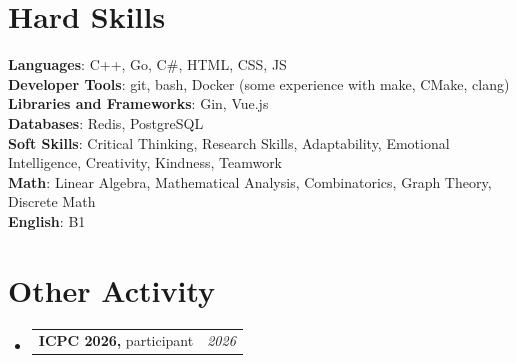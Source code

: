 \documentclass[a4paper,11pt]{article}
\makeatletter
\newcommand{\resumePOR}[3]{
\vspace{0.5mm}\item
    \begin{tabular*}{0.97\textwidth}[t]{l@{\extracolsep{\fill}}r}
        \textbf{#1}\hspace{0.3mm}#2 & \textit{\small{#3}} 
    \end{tabular*}
    \vspace{-2mm}
}
\newcommand{\resumeSubHeadingListStart}{\begin{itemize}[leftmargin=*,labelsep=0mm]}
\newcommand{\resumeSubHeadingListEnd}{\end{itemize}\vspace{2mm}}
\makeatother
\begin{document}
\section{\textbf{Hard Skills}}
 \begin{itemize}[leftmargin=0.1in, label={}]
    \small{\item{
     \textbf{Languages}{: C++, Go, C\#, HTML, CSS, JS} \\
     \textbf{Developer Tools}{: git, bash, Docker (some experience with make, CMake, clang)} \\
     \textbf{Libraries and Frameworks}{: Gin, Vue.js} \\
     \textbf{Databases}{: Redis, PostgreSQL} \\
     \textbf{Soft Skills}{: Critical Thinking, Research Skills, Adaptability, Emotional Intelligence, Creativity, Kindness, Teamwork} \\
     \textbf{Math}{: Linear Algebra, Mathematical Analysis, Combinatorics, Graph Theory, Discrete Math} \\
     \textbf{English}{: B1} \\
    }}
 \end{itemize}
 \vspace{-16pt}


\section{\textbf{Other Activity}}
\vspace{-0.4mm}
\resumeSubHeadingListStart
\resumePOR{ICPC 2026, }
    {participant}
    {2026}
\resumeSubHeadingListEnd
\vspace{-5mm}

\end{document}
